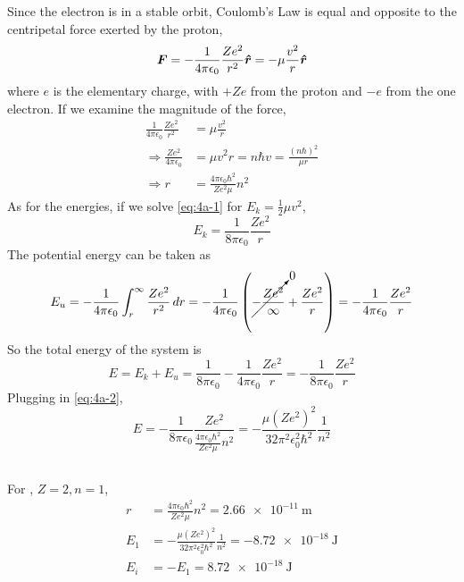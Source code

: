 \documentclass{article}
\newcommand{\unit}[1]{\bm{\hat{#1}}}
\begin{document}
Since the electron is in a stable orbit, Coulomb's Law is equal and opposite to the centripetal force exerted by the proton,
\begin{equation}
    \bm{F} = -\frac{1}{4 \pi \epsilon_0} \frac{Z e^2}{r^2} \unit{r} = -\mu \frac{v^2}{r} \unit{r} \\
\end{equation}
where \(e\) is the elementary charge, with \(+Z e\) from the proton and \(-e\) from the one electron.
If we examine the magnitude of the force,
\begin{align}
    \frac{1}{4 \pi \epsilon_0} \frac{Ze^2}{r^2} &= \mu \frac{v^2}{r} \label{eq:4a-1} \\
    \Rightarrow \frac{Ze^2}{4 \pi \epsilon_0} &= \mu v^2 r = n \hbar v = \frac{(n \hbar)^2}{\mu r} \\
    \Rightarrow r &= \frac{4 \pi \epsilon_0 \hbar^2}{Z e^2 \mu} n^2 \label{eq:4a-2}
\end{align}
As for the energies, if we solve \autoref{eq:4a-1} for \(E_k = \frac{1}{2} \mu v^2\),
\begin{equation}
    E_k = \frac{1}{8 \pi \epsilon_0} \frac{Z e^2}{r}
\end{equation}
The potential energy can be taken as
\begin{align}
    E_u = -\frac{1}{4 \pi \epsilon_0} \int_r^\infty \frac{Z e^2}{r^2} \, dr = -\frac{1}{4 \pi \epsilon_0} \left(\cancelto{0}{-\frac{Ze^2}{\infty}} + \frac{Z e^2}{r}\right) = -\frac{1}{4 \pi \epsilon_0} \frac{Z e^2}{r}
\end{align}
So the total energy of the system is
\begin{equation}
    E = E_k + E_u = \frac{1}{8 \pi \epsilon_0} - \frac{1}{4 \pi \epsilon_0} \frac{Z e^2}{r} = -\frac{1}{8 \pi \epsilon_0} \frac{Z e^2}{r}
\end{equation}
Plugging in \autoref{eq:4a-2},
\begin{equation}
    E = -\frac{1}{8 \pi \epsilon_0} \frac{Z e^2}{\frac{4 \pi \epsilon_0 \hbar^2}{Z e^2 \mu} n^2} = -\frac{\mu (Z e^2)^2}{32 \pi^2 \epsilon_0^2 \hbar^2} \frac{1}{n^2}
\end{equation}

\subsection{}

For , \(Z = 2, n = 1\),
\begin{align}
    r &= \frac{4 \pi \epsilon_0 \hbar^2}{Z e^2 \mu} n^2 = \SI{2.66e-11}{\meter} \\
    E_1 &= -\frac{\mu (Z e^2)^2}{32 \pi^2 \epsilon_0^2 \hbar^2} \frac{1}{n^2} = \SI{-8.72e-18}{\joule} \\
    E_i &= -E_1 = \SI{8.72e-18}{\joule}
\end{align}
\end{document}
